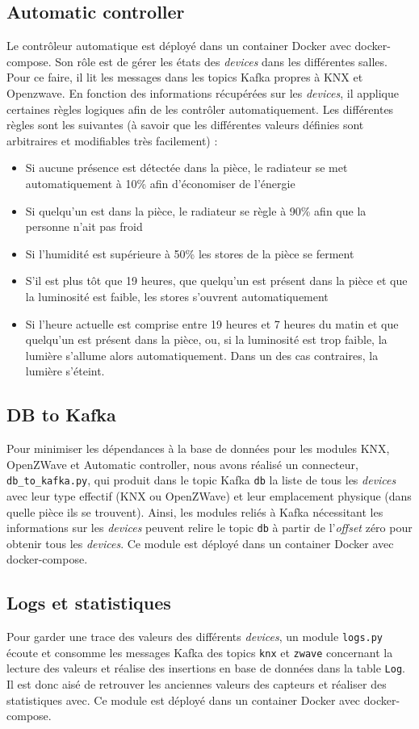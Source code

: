 \subsection{Automatic controller}
Le contrôleur automatique est déployé dans un container Docker avec docker-compose. Son rôle est de gérer les états des \textit{devices} dans les différentes salles. Pour ce faire, il lit les messages dans les topics Kafka propres à KNX et Openzwave. En fonction des informations récupérées sur les \textit{devices}, il applique certaines règles logiques afin de les contrôler automatiquement.
Les différentes règles sont les suivantes (à savoir que les différentes valeurs définies sont arbitraires et modifiables très facilement) :
\begin{itemize}
  \item Si aucune présence est détectée dans la pièce, le radiateur se met automatiquement à 10\% afin d'économiser de l'énergie
  \item Si quelqu'un est dans la pièce, le radiateur se règle à 90\% afin que la personne n'ait pas froid
  \item Si l'humidité est supérieure à 50\% les stores de la pièce se ferment
  \item S'il est plus tôt que 19 heures, que quelqu'un est présent dans la pièce et que la luminosité est faible, les stores s'ouvrent automatiquement
  \item Si l'heure actuelle est comprise entre 19 heures et 7 heures du matin et que quelqu'un est présent dans la pièce, ou, si la luminosité est trop faible, la lumière s'allume alors automatiquement. Dans un des cas contraires, la lumière s'éteint.
\end{itemize}

\subsection{DB to Kafka}
Pour minimiser les dépendances à la base de données pour les modules KNX, OpenZWave et Automatic controller, nous avons réalisé un connecteur, \texttt{db_to_kafka.py}, qui produit dans le topic Kafka \texttt{db} la liste de tous les \textit{devices} avec leur type effectif (KNX ou OpenZWave) et leur emplacement physique (dans quelle pièce ils se trouvent). Ainsi, les modules reliés à Kafka nécessitant les informations sur les \textit{devices} peuvent relire le topic \texttt{db} à partir de l'\textit{offset} zéro pour obtenir tous les \textit{devices}. Ce module est déployé dans un container Docker avec docker-compose.

\subsection{Logs et statistiques}
Pour garder une trace des valeurs des différents \textit{devices}, un module \texttt{logs.py} écoute et consomme les messages Kafka des topics \texttt{knx} et \texttt{zwave} concernant la lecture des valeurs et réalise des insertions en base de données dans la table \texttt{Log}. Il est donc aisé de retrouver les anciennes valeurs des capteurs et réaliser des statistiques avec. Ce module est déployé dans un container Docker avec docker-compose.
